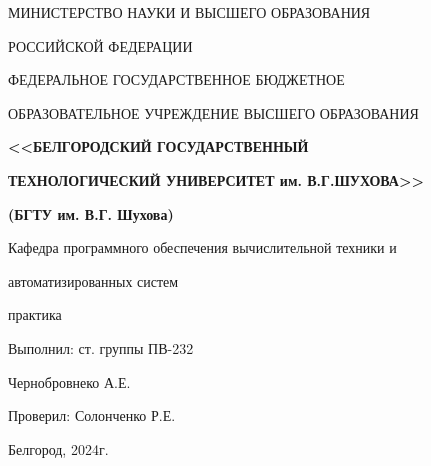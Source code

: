 \begin{center}
	МИНИСТЕРСТВО НАУКИ И ВЫСШЕГО ОБРАЗОВАНИЯ

	РОССИЙСКОЙ ФЕДЕРАЦИИ

	\vskip 0.5cm

	ФЕДЕРАЛЬНОЕ ГОСУДАРСТВЕННОЕ БЮДЖЕТНОЕ

	ОБРАЗОВАТЕЛЬНОЕ УЧРЕЖДЕНИЕ ВЫСШЕГО ОБРАЗОВАНИЯ

	\vskip 0.5cm

	\textbf{<<БЕЛГОРОДСКИЙ ГОСУДАРСТВЕННЫЙ}

	\textbf{ТЕХНОЛОГИЧЕСКИЙ УНИВЕРСИТЕТ им. В.Г.ШУХОВА>>}

	\textbf{(БГТУ им. В.Г. Шухова)}

	\vskip 0.5cm

	Кафедра программного обеспечения вычислительной техники и

	автоматизированных систем

	\vskip 3cm

	\large{ практика}

	\vskip 7cm

	\begin{flushright}
		Выполнил: ст. группы ПВ-232

		Чернобровнеко А.Е.

		Проверил: Солонченко Р.Е.
	\end{flushright}

	\vskip 6cm

	Белгород, 2024г.
\end{center}

\newpage

\onehalfspacing\tableofcontents

\newpage
